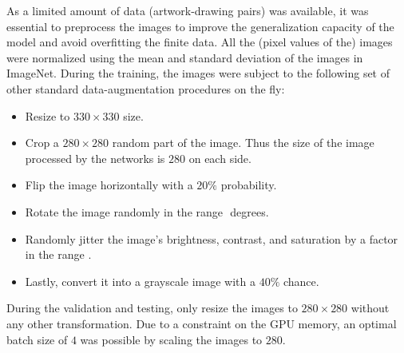 As a limited amount of data (artwork-drawing pairs) was available, it was essential to preprocess the images to improve the generalization capacity of the model and avoid overfitting the finite data. All the (pixel values of the) images were normalized using the mean and standard deviation of the images in ImageNet. During the training, the images were subject to the following set of other standard data-augmentation procedures on the fly:
\begin{itemize}
	\item Resize to \begin{math} 330 \times 330 \end{math} size.
	\item Crop a \begin{math} 280 \times 280 \end{math} random part of the image. Thus the size of the image processed by the networks is \begin{math} 280 \end{math} on each side.
	\item Flip the image horizontally with a \begin{math} 20\% \end{math} probability.
	\item Rotate the image randomly in the range \begin{math} [-5, +5] \end{math} degrees.
	\item Randomly jitter the image's brightness, contrast, and saturation by a factor in the range \begin{math} [0.9, 1.1] \end{math}.
	\item Lastly, convert it into a grayscale image with a \begin{math} 40\% \end{math} chance.
\end{itemize}
During the validation and testing, only resize the images to \begin{math} 280 \times 280 \end{math} without any other transformation. Due to a constraint on the GPU memory, an optimal batch size of \begin{math} 4 \end{math} was possible by scaling the images to \begin{math} 280 \end{math}.



